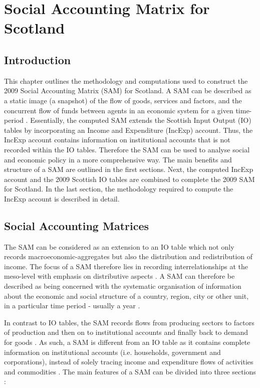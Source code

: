\chapter{Social Accounting Matrix for Scotland}
\label{Chapter2}

\section{Introduction} 
\label{sec:2.1}

This chapter outlines the methodology and computations used to construct the 2009 Social Accounting Matrix (SAM) for Scotland. A SAM can be described as a static image (a snapshot) of the flow of goods, services and factors, and the concurrent flow of funds between agents in an economic system for a given time-period . Essentially, the computed SAM extends the Scottish Input Output (IO) tables by incorporating an Income and Expenditure (IncExp) account. Thus, the IncExp account contains information on institutional accounts that is not recorded within the IO tables. Therefore the SAM can be used to analyse social and economic policy in a more comprehensive way. The main benefits and structure of a SAM are outlined in the first sections.  Next, the computed IncExp account and the 2009 Scottish IO tables are combined to complete the 2009 SAM for Scotland. In the last section, the methodology required to compute the IncExp account is described in detail.

\newpage
\section{Social Accounting Matrices} 
\label{sec:2.2}

The SAM can be considered as an extension to an IO table which not only records macroeconomic-aggregates but also the distribution and redistribution of income. The focus of a SAM therefore lies in recording interrelationships at the meso-level with emphasis on distributive aspects \cite{Keuning1988a}. A SAM can therefore be described as being concerned with the systematic organisation of information about the economic and social structure of a country, region, city or other unit, in a particular time period - usually a year \cite{King1981a}.

\bigskip

In contrast to IO tables, the SAM records flows from producing sectors to factors of production and then on to institutional accounts and finally back to demand for goods \cite{Adelman1986a}. As such, a SAM is different from an IO table as it contains complete information on institutional accounts (i.e. households, government and corporations), instead of solely tracing income and expenditure flows of activities and commodities . The main features of a SAM can be divided into three sections \cite{Round2003a}:   

